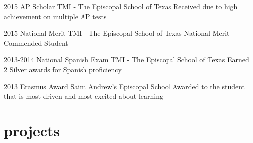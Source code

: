 \documentclass[]{friggeri-cv} %
\begin{document}
\begin{entrylist}
	

\entry
{2015}
{AP Scholar}
{TMI - The Episcopal School of Texas}
{Received due to high achievement on multiple AP tests}


\entry
{2015}
{National Merit}
{TMI - The Episcopal School of Texas}
{National Merit Commended Student}


\entry
{2013-2014}
{National Spanish Exam}
{TMI - The Episcopal School of Texas}
{Earned 2 Silver awards for Spanish proficiency}


\entry
{2013}
{Erasmus Award}
{Saint Andrew's Episcopal School}
{Awarded to the student that is most driven and most excited about learning}

	
\end{entrylist}



\section{projects}
\end{document}
